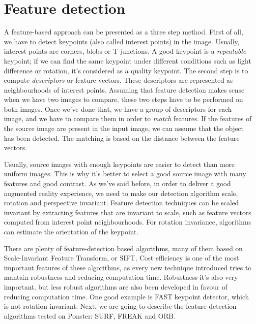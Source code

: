 \section{Feature detection}
A feature-based approach can be presented as a three step method. First of all, we
have to detect keypoints\cite{feature} (also called interest points) in the image. Usually,
interest points are corners, blobs or T-junctions. A good keypoint is a
\emph{repeatable} keypoint; if we can find the same keypoint under different
conditions such as light difference or rotation, it's considered as a quality
keypoint. The second step is to compute \emph{descriptors} or feature
vectors. These descriptors are represented as neighbourhoods of interest
points. Assuming that feature
detection makes sense when we have two images to compare, these two steps have to be
performed on both images. Once we've done that, we have a group of descriptors for
each image, and we have to compare them in order to \emph{match} features. If the
features of the source image are present in the input image, we can assume that the
object has been detected. The matching is based on the distance between the feature
vectors. 

Usually, source images with enough keypoints are easier to detect than more
uniform images. This is why it's better to select a good source image with many
features and good contrast. 
As we've said before, in order to deliver a good augmented reality experience,
we need to make our detection algorithm scale, rotation and perspective
invariant. Feature detection techniques can be scaled invariant by extracting
features that are invariant to scale, such as feature vectors computed from
interest point neighbourhoods. For rotation invariance, algorithms can
estimate the orientation of the keypoint. %

There are plenty of feature-detection based algorithms, many of them based on
Scale-Invariant Feature Transform, or SIFT. Cost efficiency is one of the most
important features of these algorithms, as every new technique introduced tries to
mantain robustness and reducing computation time. Robustness it's also very
important, but less robust algorithms are also been developed in favour of reducing
computation time. One good example is FAST\cite{6126544} keypoint detector, which is
not rotation invariant. %
Next, we are going to describe the feature-detection algorithms tested on Ponster:
SURF, FREAK and ORB.


